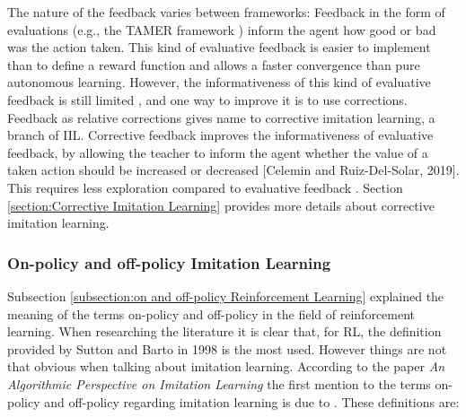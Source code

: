  The nature of the feedback varies between frameworks: Feedback in the form of evaluations (e.g., the TAMER framework \cite{TAMER-Knox-Stone:2009}) inform the agent how good or bad was the action taken. This kind of evaluative feedback is easier to implement than to define a reward function and allows a faster convergence than pure autonomous learning. 
However, the informativeness of this kind of evaluative feedback is still limited \cite{types-feedback-najar:2020}, and one way to improve it is to use corrections. Feedback as relative corrections \cite{Relative-corrections-Celemin:2019} gives name to corrective imitation learning, a branch of IIL. Corrective feedback improves the informativeness of evaluative feedback, by allowing the teacher to inform the agent whether the value of a taken action should be increased or decreased [Celemin and Ruiz-Del-Solar, 2019]. This requires less exploration compared to evaluative feedback \cite{types-feedback-najar:2020}. Section \ref{section:Corrective Imitation Learning} provides more details about corrective imitation learning.




\subsubsection{On-policy and off-policy Imitation Learning}
\label{subsubsection:on and off-policy Imitation Learning}

Subsection \ref{subsection:on and off-policy Reinforcement Learning} explained the meaning of the terms on-policy and off-policy in the field of reinforcement learning. When researching the literature it is clear that, for RL,  the definition provided by Sutton and Barto in 1998 is the most used. However things are not that obvious when talking about imitation learning. According to the paper \textit{An Algorithmic Perspective on Imitation Learning} \cite{Osa:2018} the first mention to the terms on-policy and off-policy regarding imitation learning is due to \cite{DBLP:journals/corr/LaskeyLHLMFG17}. These definitions are:
\setlength{\parskip}{1em} 


